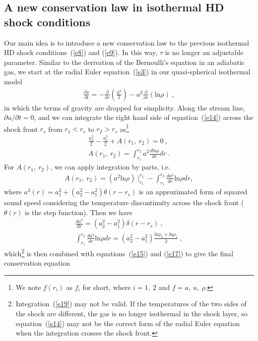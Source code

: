 \documentclass[fleqn,usenatbib]{mnras}
\begin{document}
\subsection{A new conservation law in isothermal HD shock conditions}
\label{s1.2}
Our main idea is to introduce a new conservation law to the previous isothermal HD shock conditions~(\ref{e8}) and (\ref{e9}). In this way, $\tau$ is no longer an adjustable parameter. Similar to the derivation of the Bernoulli's equation in an adiabatic gas, we start at the radial Euler equation~(\ref{e3}) in our quasi-spherical isothermal model 
\begin{gather}
\frac{\partial u}{\partial t}=-\frac{\partial}{\partial r}\left(\frac{u^{2}}{2}\right)-a^{2}\frac{\partial}{\partial r}\left(\mathrm{ln}\rho\right)\label{e14}\ ,
\end{gather}
in which the terms of gravity are dropped for simplicity. Along the stream line, $\partial u/\partial t=0$, and we can integrate the right hand side of equation~(\ref{e14}) across the shock front $r_{s}$ from $r_{1}<r_{s}$ to $r_{2}>r_{s}$ as\footnote{We note $f(r_{i})$ as $f_{i}$ for short, where $i=1,\ 2$ and $f=a,\ u,\ \rho$.}
\begin{gather}
\frac{u_{2}^{2}}{2}-\frac{u_{1}^{2}}{2}+A(r_{1},\ r_{2})=0\label{e15}\ ,\\
A(r_{1},\ r_{2})=\int_{r_{1}}^{r_{2}}a^{2}\frac{d\mathrm{ln}\rho}{dr}dr\label{e16}\ .
\end{gather}
For $A(r_{1},\ r_{2})$, we can apply integration by parts, i.e.
\begin{align}
A(r_{1},\ r_{2})=\left(a^{2}\mathrm{ln}\rho\right)\mid_{r_{1}}^{r_{2}}-\int_{r_{1}}^{r_{2}}\frac{da^{2}}{dr}\mathrm{ln}\rho dr\label{e17},
\end{align}
where $a^{2}(r)=a_{1}^{2}+\left(a_{2}^{2}-a_{1}^{2}\right)\theta(r-r_{s})$ is an approximated form of squared sound speed considering the temperature discontinuity across the shock front ($\theta(r)$ is the step function). Then we have
\begin{gather}
\frac{d a^{2}}{dr}=\left(a_{2}^{2}-a_{1}^{2}\right)\delta(r-r_{s})\label{e18}\ ,\\
\int_{r_{1}}^{r_{2}}\frac{da^{2}}{dr}\mathrm{ln}\rho dr=\left(a_{2}^{2}-a_{1}^{2}\right)\frac{\mathrm{ln}\rho_{2}+\mathrm{ln}\rho_{1}}{2}\label{e19}\ ,
\end{gather}
which\footnote{Integration~(\ref{e19}) may not be valid. If the temperatures of the two sides of the shock are different, the gas is no longer isothermal in the shock layer, so equation~(\ref{e14}) may not be the correct form of the radial Euler equation when the integration crosses the shock front.} is then combined with equations~(\ref{e15}) and (\ref{e17}) to give the final conservation equation
\end{document}
